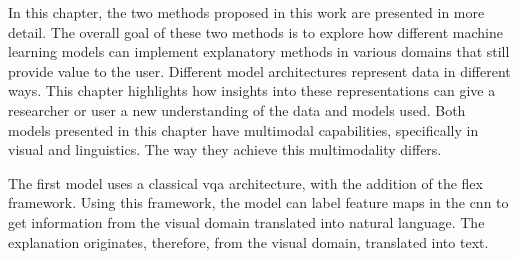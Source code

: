 \label{sec:3_methodology}

In this chapter, the two methods proposed in this work are presented in more detail. The overall goal of these two methods is to explore how different machine learning models can implement explanatory methods in various domains that still provide value to the user. Different model architectures represent data in different ways. 
This chapter highlights how insights into these representations can give a researcher or user a new understanding of the data and models used.
Both models presented in this chapter have multimodal capabilities, specifically in visual and linguistics. The way they achieve this multimodality differs. 

The first model uses a classical \gls{vqa} architecture, with the addition of the \gls{flex} framework. 
Using this framework, the model can label feature maps in the \gls{cnn} to get information from the visual domain translated into natural language. The explanation originates, therefore, from the visual domain, translated into text. 


